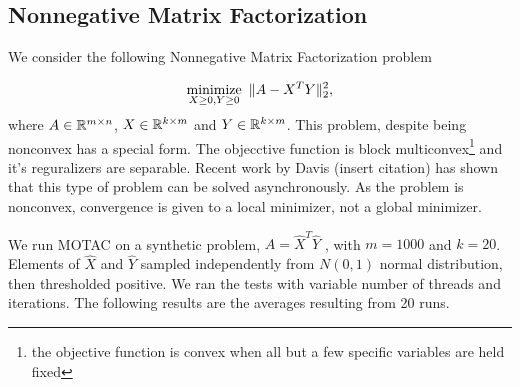 \subsection{Nonnegative Matrix Factorization}

We consider the following Nonnegative Matrix Factorization problem

\begin{equation*}
	\operatorname*{minimize}_{X \geq 0,Y \geq 0} ~\|A-X^T Y\|_2^2,
\end{equation*}
where $A \in \mathbb{R}^{m\times n}$, $X \in \mathbb{R}^{k \times m}$ and $Y \in \mathbb{R}^{k \times m}$.
This problem, despite being nonconvex has a special form.
The objecctive function  is block multiconvex\footnote{the objective function is convex when all but a few specific variables are held fixed} and it's reguralizers are separable.
Recent work by Davis (insert citation) has shown that this type of problem can be solved asynchronously.
As the problem is nonconvex, convergence is given to a local minimizer, not a global minimizer.

We run MOTAC on a synthetic problem, $A=\hat X^T \hat Y$ ,  with $m=1000$ and $k=20$.
Elements of $\hat X$ and $\hat Y$ sampled independently from $N(0, 1)$ normal distribution, then thresholded positive.
We ran the tests with variable number of threads and iterations. 
The following results are the averages resulting from 20 runs.



